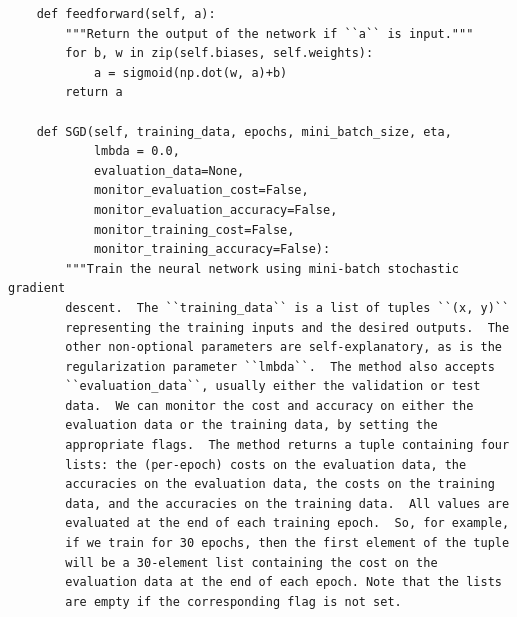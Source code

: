 \begin{lstlisting}
    def feedforward(self, a):
        """Return the output of the network if ``a`` is input."""
        for b, w in zip(self.biases, self.weights):
            a = sigmoid(np.dot(w, a)+b)
        return a

    def SGD(self, training_data, epochs, mini_batch_size, eta,
            lmbda = 0.0,
            evaluation_data=None,
            monitor_evaluation_cost=False,
            monitor_evaluation_accuracy=False,
            monitor_training_cost=False,
            monitor_training_accuracy=False):
        """Train the neural network using mini-batch stochastic gradient
        descent.  The ``training_data`` is a list of tuples ``(x, y)``
        representing the training inputs and the desired outputs.  The
        other non-optional parameters are self-explanatory, as is the
        regularization parameter ``lmbda``.  The method also accepts
        ``evaluation_data``, usually either the validation or test
        data.  We can monitor the cost and accuracy on either the
        evaluation data or the training data, by setting the
        appropriate flags.  The method returns a tuple containing four
        lists: the (per-epoch) costs on the evaluation data, the
        accuracies on the evaluation data, the costs on the training
        data, and the accuracies on the training data.  All values are
        evaluated at the end of each training epoch.  So, for example,
        if we train for 30 epochs, then the first element of the tuple
        will be a 30-element list containing the cost on the
        evaluation data at the end of each epoch. Note that the lists
        are empty if the corresponding flag is not set.


\end{lstlisting}
